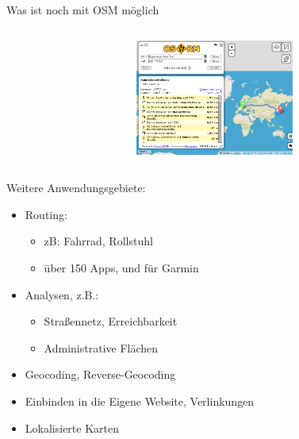 \documentclass{beamer}
\begin{document}
\begin{frame}{Was ist noch mit OSM möglich}

  \vspace{-1.9cm}
\begin{columns}
\begin{column}[l]{5cm}

\end{column}
\begin{column}[r]{4cm}
 \begin{figure}
        \includegraphics[width=5.2cm]{osrm.png}
    \end{figure}   
\end{column}
\end{columns}

  \vspace{-4cm}

Weitere Anwendungsgebiete:
\begin{itemize}
    \item Routing:
    \begin{itemize}
        \item zB: Fahrrad, Rollstuhl
        \item über 150 Apps, und für Garmin
    \end{itemize}
    \item Analysen, z.B.:
    \begin{itemize}
        \item Straßennetz, Erreichbarkeit
        \item Administrative Flächen
    \end{itemize}
    \item Geocoding, Reverse-Geocoding
    \item Einbinden in die Eigene Website, Verlinkungen
    \item Lokalisierte Karten
    
\end{itemize}

\end{frame}


\hypersetup{urlcolor=cyan}
\end{document}
